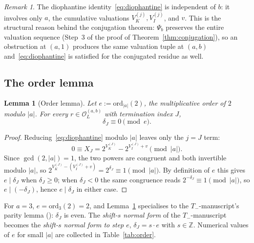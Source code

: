 \documentclass[11pt,reqno]{amsart}
\theoremstyle{plain}
\newtheorem{lemma}[theorem]{Lemma}
\theoremstyle{definition}
\theoremstyle{remark}
\newtheorem{remark}[theorem]{Remark}
\newcommand{\Tneg}{T_{-}}
\newcommand{\Z}{\mathbb{Z}}
\newcommand{\Obs}{\mathcal{O}}
\newcommand{\Vk}{V_{K}}
\newcommand{\Vi}{V_{I}}
\newcommand{\ord}{\mathrm{ord}}
\newcommand{\Psib}{\Psi_{b}}
\newcommand{\Obsab}{\Obs_{L}^{(a,b)}}
\begin{document}
\begin{remark}\label{rem:b-independence}
The diophantine identity~\eqref{eq:diophantine} is independent of $b$: it
involves only $a$, the cumulative valuations $\Vk^{(j)}, \Vi^{(j)}$, and
$v$. This is the structural reason behind the conjugation theorem:
$\Psib$ preserves the entire valuation sequence (Step~3 of the proof of
Theorem~\ref{thm:conjugation}), so an obstruction at $(a,1)$ produces
the same valuation tuple at $(a,b)$ and~\eqref{eq:diophantine} is
satisfied for the conjugated residue as well.
\end{remark}

\subsection{The order lemma}

\begin{lemma}[Order lemma]\label{lem:order-lemma}
Let $e := \ord_{\lvert a \rvert}(2)$, the multiplicative order of $2$
modulo $\lvert a \rvert$. For every $r \in \Obsab$ with termination
index $J$,
\[
\delta_J \equiv 0 \pmod{e}.
\]
\end{lemma}

\begin{proof}
Reducing~\eqref{eq:diophantine} modulo $\lvert a \rvert$ leaves only the
$j = J$ term:
\[
0 \equiv X_J = 2^{\Vk^{(J)}} - 2^{\Vi^{(J)} + v} \pmod{\lvert a \rvert}.
\]
Since $\gcd(2, \lvert a \rvert) = 1$, the two powers are congruent and
both invertible modulo $\lvert a \rvert$, so
$2^{\Vk^{(J)} - (\Vi^{(J)} + v)} = 2^{\delta_J} \equiv 1
\pmod{\lvert a \rvert}$. By definition of $e$ this gives $e \mid
\delta_J$ when $\delta_J \ge 0$; when $\delta_J < 0$ the same congruence
reads $2^{-\delta_J} \equiv 1 \pmod{\lvert a \rvert}$, so $e \mid
(-\delta_J)$, hence $e \mid \delta_J$ in either case. \qedhere
\end{proof}

For $a = 3$, $e = \ord_3(2) = 2$, and Lemma~\ref{lem:order-lemma}
specialises to the $\Tneg$-manuscript's parity lemma
(\cite[Lemma~2.4]{ObstructionResidues2026}): $\delta_J$ is even. The
\emph{shift-$s$ normal form} of the $\Tneg$-manuscript becomes the
\emph{shift-$s$ normal form to step $e$}, $\delta_J = s \cdot e$ with
$s \in \Z$. Numerical values of $e$ for small $\lvert a \rvert$ are
collected in Table~\ref{tab:order}.
\end{document}

